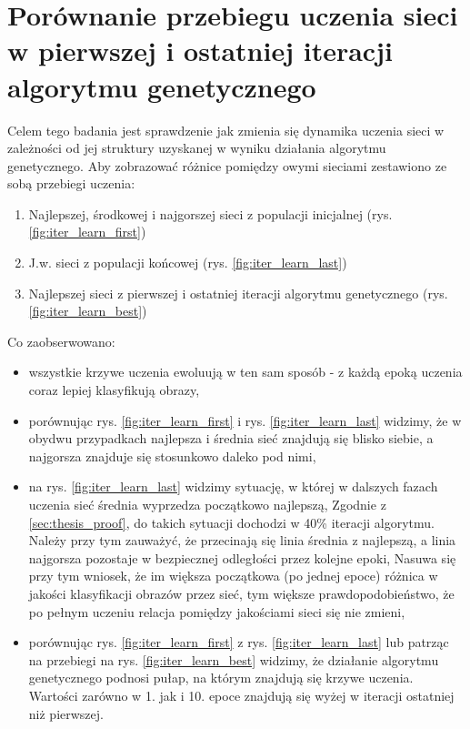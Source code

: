 \section{Porównanie przebiegu uczenia sieci w pierwszej i ostatniej iteracji algorytmu genetycznego}
Celem tego badania jest sprawdzenie jak zmienia się dynamika uczenia sieci w zależności od jej struktury uzyskanej w wyniku działania algorytmu genetycznego.
Aby zobrazować różnice pomiędzy owymi sieciami zestawiono ze sobą przebiegi uczenia:
\begin{enumerate}
  \item Najlepszej, środkowej i najgorszej sieci z populacji inicjalnej (rys. \ref{fig:iter_learn_first})
  \item J.w. sieci z populacji końcowej (rys. \ref{fig:iter_learn_last})
  \item Najlepszej sieci z pierwszej i ostatniej iteracji algorytmu genetycznego (rys. \ref{fig:iter_learn_best})
\end{enumerate}
Co zaobserwowano:
\begin{itemize}
  \item wszystkie krzywe uczenia ewoluują w ten sam sposób - z każdą epoką uczenia coraz lepiej klasyfikują obrazy,
  \item porównując rys. \ref{fig:iter_learn_first} i rys. \ref{fig:iter_learn_last} widzimy, że w obydwu przypadkach najlepsza i średnia sieć znajdują się blisko siebie, a najgorsza znajduje się stosunkowo daleko pod nimi,
  \item na rys. \ref{fig:iter_learn_last} widzimy sytuację, w której w dalszych fazach uczenia sieć średnia wyprzedza początkowo najlepszą,
  Zgodnie z \ref{sec:thesis_proof}, do takich sytuacji dochodzi w 40\% iteracji algorytmu.
  Należy przy tym zauważyć, że przecinają się linia średnia z najlepszą, a linia najgorsza pozostaje w bezpiecznej odległości przez kolejne epoki,
  Nasuwa się przy tym wniosek, że im większa początkowa (po jednej epoce) różnica w jakości klasyfikacji obrazów przez sieć, tym większe prawdopodobieństwo, że po pełnym uczeniu relacja pomiędzy jakościami sieci się nie zmieni,
  \item porównując rys. \ref{fig:iter_learn_first} z rys. \ref{fig:iter_learn_last} lub patrząc na przebiegi na rys. \ref{fig:iter_learn_best} widzimy, że działanie algorytmu genetycznego podnosi pułap, na którym znajdują się krzywe uczenia.
  Wartości zarówno w 1. jak i 10. epoce znajdują się wyżej w iteracji ostatniej niż pierwszej.

\end{itemize}

